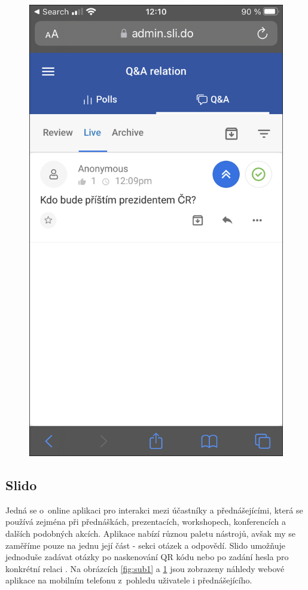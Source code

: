 \begin{figure}[h]
\begin{minipage}{.5\textwidth}
  \includegraphics[width=.9\linewidth]{obrazky/slido_admin.png}
  \label{fig:sub2}
\end{minipage}
\end{figure}

\subsection{Slido}
Jedná se o~online aplikaci pro interakci mezi účastníky a přednášejícími, která se používá zejména při přednáškách, prezentacích, workshopech, konferencích a dalších podobných akcích. Aplikace nabízí různou paletu nástrojů, avšak my se zaměříme pouze na jednu její část - sekci otázek a odpovědí. Slido umožňuje jednoduše zadávat otázky po naskenování QR kódu nebo po zadání hesla pro konkrétní relaci \cite{slidosection}. Na obrázcích \ref{fig:sub1} a \ref{fig:sub2} jsou zobrazeny náhledy webové aplikace na mobilním telefonu z~pohledu uživatele i přednášejícího.

